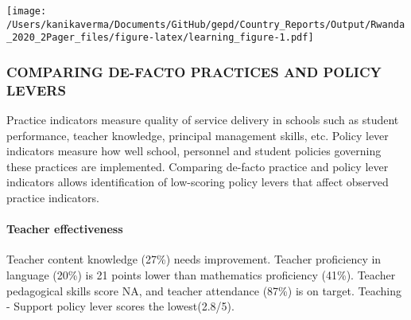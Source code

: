 \documentclass[twocolumn]{article}
\let\oldparagraph\paragraph
\renewcommand{\paragraph}[1]{\oldparagraph{#1}\mbox{}}
\begin{document}
\texttt{[image: /Users/kanikaverma/Documents/GitHub/gepd/Country\_Reports/Output/Rwanda\_2020\_2Pager\_files/figure-latex/learning\_figure-1.pdf]}

\hypertarget{comparing-de-facto-practices-and-policy-levers}{%
\subsubsection{\texorpdfstring{\textbf{COMPARING DE-FACTO PRACTICES AND
POLICY
LEVERS}}{COMPARING DE-FACTO PRACTICES AND POLICY LEVERS}}\label{comparing-de-facto-practices-and-policy-levers}}

Practice indicators measure quality of service delivery in schools such
as student performance, teacher knowledge, principal management skills,
etc. Policy lever indicators measure how well school, personnel and
student policies governing these practices are implemented. Comparing
de-facto practice and policy lever indicators allows identification of
low-scoring policy levers that affect observed practice indicators.

\hypertarget{teacher-effectiveness}{%
\paragraph{\texorpdfstring{\textbf{Teacher
effectiveness}}{Teacher effectiveness}}\label{teacher-effectiveness}}

Teacher content knowledge (27\%) needs improvement. Teacher proficiency
in language (20\%) is 21 points lower than mathematics proficiency
(41\%). Teacher pedagogical skills score NA, and teacher attendance
(87\%) is on target. Teaching - Support policy lever scores the
lowest(2.8/5).
\end{document}

